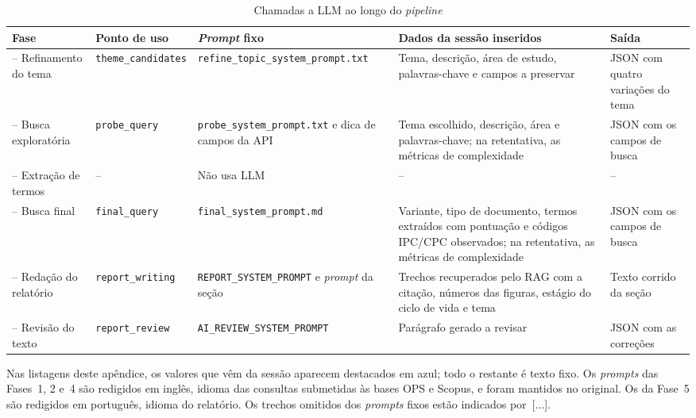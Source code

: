 \documentclass[12pt, a4paper]{article}
\begin{document}
\begin{table}[H]
\centering
\caption{Chamadas a LLM ao longo do \textit{pipeline}}
\label{tab:prompts-resumo}
\footnotesize
\begin{tabular}{>{\raggedright\arraybackslash}p{1.8cm}>{\raggedright\arraybackslash}p{2.0cm}>{\raggedright\arraybackslash}p{3.0cm}>{\raggedright\arraybackslash}p{3.7cm}>{\raggedright\arraybackslash}p{1.8cm}}
\toprule
\textbf{Fase} & \textbf{Ponto de uso} & \textbf{\textit{Prompt} fixo} & \textbf{Dados da sessão inseridos} & \textbf{Saída} \\
\midrule
1 -- Refinamento do tema & \texttt{theme\_\allowbreak{}candidates} & \texttt{refine\_\allowbreak{}topic\_\allowbreak{}system\_\allowbreak{}prompt.txt} & Tema, descrição, área de estudo, palavras-chave e campos a preservar & JSON com quatro variações do tema \\
2 -- Busca exploratória & \texttt{probe\_\allowbreak{}query} & \texttt{probe\_\allowbreak{}system\_\allowbreak{}prompt.txt} e dica de campos da API & Tema escolhido, descrição, área e palavras-chave; na retentativa, as métricas de complexidade & JSON com os campos de busca \\
3 -- Extração de termos & -- & Não usa LLM & -- & -- \\
4 -- Busca final & \texttt{final\_\allowbreak{}query} & \texttt{final\_\allowbreak{}system\_\allowbreak{}prompt.md} & Variante, tipo de documento, termos extraídos com pontuação e códigos IPC/CPC observados; na retentativa, as métricas de complexidade & JSON com os campos de busca \\
5 -- Redação do relatório & \texttt{report\_\allowbreak{}writing} & \texttt{REPORT\_\allowbreak{}SYSTEM\_\allowbreak{}PROMPT} e \textit{prompt} da seção & Trechos recuperados pelo RAG com a citação, números das figuras, estágio do ciclo de vida e tema & Texto corrido da seção \\
5 -- Revisão do texto & \texttt{report\_\allowbreak{}review} & \texttt{AI\_\allowbreak{}REVIEW\_\allowbreak{}SYSTEM\_\allowbreak{}PROMPT} & Parágrafo gerado a revisar & JSON com as correções \\
\bottomrule
\end{tabular}
\end{table}

  Nas listagens deste apêndice, os valores que vêm da sessão aparecem
\textcolor{dadosessao}{destacados em azul}; todo o restante é texto fixo. Os
\textit{prompts} das Fases~1, 2 e~4 são redigidos em inglês, idioma das
consultas submetidas às bases OPS e Scopus, e foram mantidos no original. Os
da Fase~5 são redigidos em português, idioma do relatório. Os trechos
omitidos dos \textit{prompts} fixos estão indicados por~[...].
\end{document}
